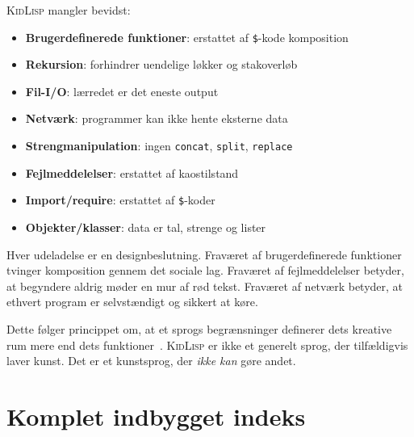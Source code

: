 \documentclass[10pt,letterpaper,twocolumn]{article}
\newcommand{\kl}{\textsc{KidLisp}}
\begin{document}
\kl{} mangler bevidst:

\begin{itemize}
  \item \textbf{Brugerdefinerede funktioner}: erstattet af \texttt{\$}-kode komposition
  \item \textbf{Rekursion}: forhindrer uendelige løkker og stakoverløb
  \item \textbf{Fil-I/O}: lærredet er det eneste output
  \item \textbf{Netværk}: programmer kan ikke hente eksterne data
  \item \textbf{Strengmanipulation}: ingen \texttt{concat}, \texttt{split}, \texttt{replace}
  \item \textbf{Fejlmeddelelser}: erstattet af kaostilstand
  \item \textbf{Import/require}: erstattet af \texttt{\$}-koder
  \item \textbf{Objekter/klasser}: data er tal, strenge og lister
\end{itemize}

Hver udeladelse er en designbeslutning. Fraværet af brugerdefinerede funktioner tvinger komposition gennem det sociale lag. Fraværet af fejlmeddelelser betyder, at begyndere aldrig møder en mur af rød tekst. Fraværet af netværk betyder, at ethvert program er selvstændigt og sikkert at køre.

Dette følger princippet om, at et sprogs begrænsninger definerer dets kreative rum mere end dets funktioner~\citep{papert1980mindstorms, compton2015casual}. \kl{} er ikke et generelt sprog, der tilfældigvis laver kunst. Det er et kunstsprog, der \emph{ikke kan} gøre andet.

\section{Komplet indbygget indeks}
\end{document}
